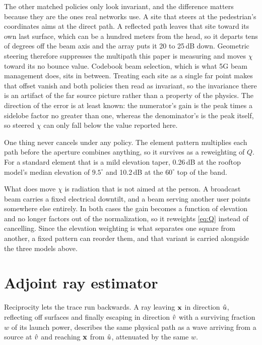 The other matched policies only look invariant, and the difference matters
because they are the ones real networks use. A site that steers at the
pedestrian's coordinates aims at the direct path. A reflected path leaves that
site toward its own last surface, which can be a hundred meters from the head,
so it departs tens of degrees off the beam axis and the array puts it 20 to
25\,dB down. Geometric steering therefore suppresses the multipath this
paper is measuring and moves $\chi$ toward its no bounce value. Codebook beam
selection, which is what 5G beam management does, sits in between. Treating each
site as a single far point makes that offset vanish and both policies then read
as invariant, so the invariance there is an artifact of the far source picture
rather than a property of the physics. The direction of the error is at least
known: the numerator's gain is the peak times a sidelobe factor no greater than
one, whereas the denominator's is the peak itself, so steered $\chi$ can only
fall below the value reported here.

One thing never cancels under any policy. The element pattern multiplies each
path before the aperture combines anything, so it survives as a reweighting of
$Q$. For a standard element that is a mild elevation taper, 0.26\,dB at the
rooftop model's median elevation of $9.5^\circ$ and 10.2\,dB at the
$60^\circ$ top of the band.

What does move $\chi$ is radiation that is not aimed at the person. A broadcast
beam carries a fixed electrical downtilt, and a beam serving another user points
somewhere else entirely. In both cases the gain becomes a function of elevation
and no longer factors out of the normalization, so it reweights
\eqref{eq:Q} instead of cancelling. Since the elevation weighting is what
separates one square from another, a fixed pattern can reorder them, and that
variant is carried alongside the three models above.

\section{Adjoint ray estimator}

Reciprocity lets the trace run backwards. A ray leaving $\mathbf{x}$ in direction
$\hat{u}$, reflecting off surfaces and finally escaping in direction $\hat{v}$ with
a surviving fraction $w$ of its launch power, describes the same physical path
as a wave arriving from a source at $\hat{v}$ and reaching $\mathbf{x}$ from $\hat{u}$,
attenuated by the same $w$.

